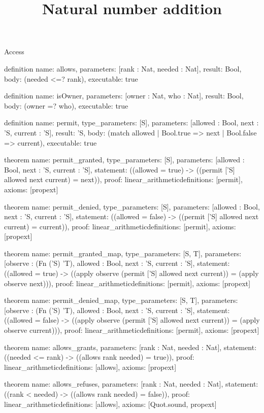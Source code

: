 \begin{lexlean}{Access}
\title{Natural number addition}
\begin{semanticmodule}
definition{
  name: allows,
  parameters: [rank : Nat, needed : Nat],
  result: Bool,
  body: (needed <=? rank),
  executable: true
}

definition{
  name: isOwner,
  parameters: [owner : Nat, who : Nat],
  result: Bool,
  body: (owner =? who),
  executable: true
}

definition{
  name: permit,
  type_parameters: [S],
  parameters: [allowed : Bool, next : 'S, current : 'S],
  result: 'S,
  body: (match allowed | Bool.true => next | Bool.false => current),
  executable: true
}

theorem{
  name: permit_granted,
  type_parameters: [S],
  parameters: [allowed : Bool, next : 'S, current : 'S],
  statement: ((allowed = true) -> ((permit ['S] allowed next current) = next)),
  proof: linear_arithmetic{definitions: [permit]},
  axioms: [propext]
}

theorem{
  name: permit_denied,
  type_parameters: [S],
  parameters: [allowed : Bool, next : 'S, current : 'S],
  statement: ((allowed = false) -> ((permit ['S] allowed next current) = current)),
  proof: linear_arithmetic{definitions: [permit]},
  axioms: [propext]
}

theorem{
  name: permit_granted_map,
  type_parameters: [S, T],
  parameters: [observe : (Fn ('S) 'T), allowed : Bool, next : 'S, current : 'S],
  statement: ((allowed = true) -> ((apply observe (permit ['S] allowed next current)) = (apply observe next))),
  proof: linear_arithmetic{definitions: [permit]},
  axioms: [propext]
}

theorem{
  name: permit_denied_map,
  type_parameters: [S, T],
  parameters: [observe : (Fn ('S) 'T), allowed : Bool, next : 'S, current : 'S],
  statement: ((allowed = false) -> ((apply observe (permit ['S] allowed next current)) = (apply observe current))),
  proof: linear_arithmetic{definitions: [permit]},
  axioms: [propext]
}

theorem{
  name: allows_grants,
  parameters: [rank : Nat, needed : Nat],
  statement: ((needed <= rank) -> ((allows rank needed) = true)),
  proof: linear_arithmetic{definitions: [allows]},
  axioms: [propext]
}

theorem{
  name: allows_refuses,
  parameters: [rank : Nat, needed : Nat],
  statement: ((rank < needed) -> ((allows rank needed) = false)),
  proof: linear_arithmetic{definitions: [allows]},
  axioms: [Quot.sound, propext]
}


\end{semanticmodule}
\end{lexlean}
